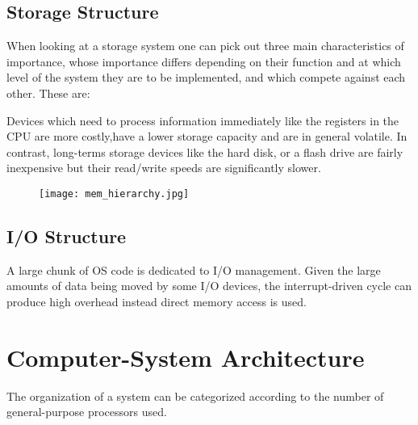 	\subsection{Storage Structure}

	\par{When looking at a storage system one can pick out three main characteristics of importance, whose importance differs depending on their function and at which level of the system they are to be implemented, and which compete against each other. These are: }
	\par{Devices which need to process information immediately like the registers in the CPU are more costly,have a lower storage capacity and are in general volatile. In contrast, long-terms storage devices like the hard disk, or a flash drive are fairly inexpensive but their read/write speeds are significantly slower.}

	\begin{figure}[H]
		\begin{center}
		\texttt{[image: mem\_hierarchy.jpg]}
		\end{center}
	\end{figure}


	\subsection{I/O Structure}

	\par{A large chunk of OS code is dedicated to I/O management. Given the large amounts of data being moved by some I/O devices, the interrupt-driven cycle can produce high overhead instead direct memory access is used.}


\section{Computer-System Architecture}

	\par{The organization of a system can be categorized according to the number of general-purpose processors used.}


